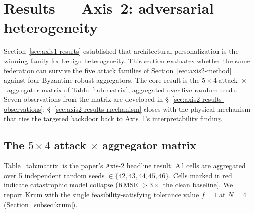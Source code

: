 \documentclass[preprint,12pt,authoryear]{elsarticle}
\begin{document}


\section{Results --- Axis~2: adversarial heterogeneity}
\label{sec:axis2-results}

Section~\ref{sec:axis1-results} established that architectural
personalization is the winning family for benign heterogeneity. This
section evaluates whether the same federation can survive the five
attack families of Section~\ref{sec:axis2-method} against four
Byzantine-robust aggregators. The core result is the $5 \times 4$
attack~$\times$~aggregator matrix of Table~\ref{tab:matrix},
aggregated over five random seeds. Seven observations from the matrix
are developed in \S~\ref{sec:axis2-results-observations};
\S~\ref{sec:axis2-results-mechanism} closes with the physical
mechanism that ties the targeted backdoor back to Axis~1's
interpretability finding.

\subsection{The $5 \times 4$ attack $\times$ aggregator matrix}
\label{sec:axis2-results-matrix}

Table~\ref{tab:matrix} is the paper's Axis-2 headline result. All
cells are aggregated over 5 independent random seeds
$\in \{42, 43, 44, 45, 46\}$. Cells marked in red indicate
catastrophic model collapse (RMSE $> 3\times$ the clean baseline).
We report Krum with the single feasibility-satisfying tolerance
value $f = 1$ at $N = 4$ (Section~\ref{subsec:krum}).
\end{document}
